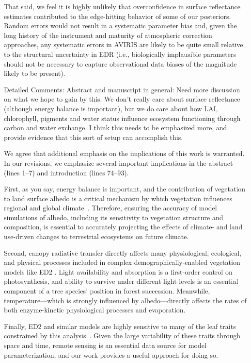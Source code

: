 That said, we feel it is highly unlikely that overconfidence in surface reflectance estimates contributed to the edge-hitting behavior of some of our posteriors.
Random errors would not result in a systematic parameter bias and, given the long history of the instrument and maturity of atmospheric correction approaches, any systematic errors in AVIRIS are likely to be quite small relative to the structural uncertainty in EDR (i.e., biologically implausible parameters should not be necessary to capture observational data biases of the magnitude likely to be present).

\begin{reviewer}
  Detailed Comments:
  Abstract and manuscript in general: Need more discussion on what we hope to gain by this. We don’t really care about surface reflectance (although energy balance is important), but we do care about how LAI, chlorophyll, pigments and water status influence ecosystem functioning through carbon and water exchange. I think this needs to be emphasized more, and provide evidence that this sort of setup can accomplish this.
\end{reviewer}

We agree that additional emphasis on the implications of this work is warranted.
In our revisions, we emphasize several important implications in the abstract (lines 1--7) and introduction (lines 74--93).

First, as you say, energy balance is important, and the contribution of vegetation to land surface albedo is a critical mechanism by which vegetation influences regional and global climate~\citep{bonan2008forests}. Therefore, ensuring the accuracy of model simulations of albedo, including its sensitivity to vegetation structure and composition, is essential to accurately projecting the effects of climate- and land use-driven changes to terrestrial ecosystems on future climate.

Second, canopy radiative transfer directly affects many physiological, ecological, and physical processes included in complex demographically-enabled vegetation models like ED2 \citep{viskari_2019_influence}.
Light availability and absorption is a first-order control on photosynthesis, and ability to survive under different light levels is an essential component of a tree species’ position in forest succession.
Meanwhile, temperature---which is strongly influenced by albedo---directly affects the rates of both enzyme-kinetic physiological processes and evaporation.

Finally, ED2 and similar models are highly sensitive to many of the leaf traits constrained by this analysis~\citep{raczka_2018_what, dietze2014quantitative, shiklomanov2020structurea}.
Given the large variability of these traits through space and time, remote sensing is an essential data source for model parameterization, and our work provides a useful approach for doing so.

